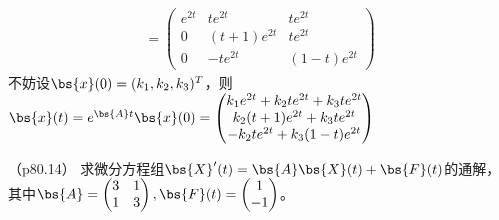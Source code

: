 \documentclass[12pt, a4paper, oneside, UTF8]{ctexbook}
\begin{document}
\begin{solution}
\begin{align*}
    =\begin{pmatrix}
        e^{2t} &te^{2t}&te^{2t} \\
        0 &  (t+1)e^{2t} &te^{2t}\\
        0 & -te^{2t} &(1-t)e^{2t}
    \end{pmatrix}
    \end{align*}
    不妨设$\bs{x}(0)=(k_1,k_2,k_3)^T$，则
    $\bs{x}(t)=e^{\bs{A}t}\bs{x}(0)=\begin{pmatrix}
        k_1e^{2t}+k_2te^{2t}+k_3te^{2t} \\
        k_2(t+1)e^{2t}+k_3te^{2t}\\
        -k_2te^{2t}+k_3(1-t)e^{2t}
    \end{pmatrix}$

\end{solution}



\begin{question}（p80.14）
    求微分方程组$\bs{X}'(t)=\bs{A}\bs{X}(t)+\bs{F}(t)$的通解，其中$\bs{A}=\begin{pmatrix}
        3 &1  \\
        1 & 3  \\
    \end{pmatrix},\bs{F}(t)=\begin{pmatrix}
        1 \\
        -1
    \end{pmatrix}$。
\end{question}
\end{document}
